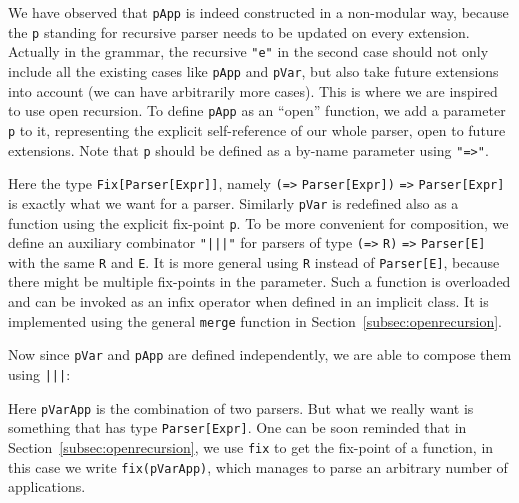 We have observed that \lstinline{pApp} is indeed constructed in a
non-modular way, because the \lstinline{p} standing for recursive
parser needs to be updated on every extension. Actually in the
grammar, the recursive \lstinline{"e"} in the second case should not
only include all the existing cases like \lstinline{pApp} and
\lstinline{pVar}, but also take future extensions into account (we can
have arbitrarily more cases). This is where we are inspired to use
open recursion. To define \lstinline{pApp} as an ``open'' function, we
add a parameter \lstinline{p} to it, representing the explicit
self-reference of our whole parser, open to future extensions. Note
that \lstinline{p} should be defined as a by-name parameter using
\lstinline{"=>"}.


Here the type \lstinline{Fix[Parser[Expr]]}, namely \lstinline{(=>} \lstinline{Parser[Expr])} \lstinline{=>} \lstinline{Parser[Expr]} is exactly what we want for a parser. Similarly \lstinline{pVar} is redefined also as a function using the explicit fix-point \lstinline{p}. To be more convenient for composition, we define an auxiliary combinator \lstinline{"|||"} for parsers of type \lstinline{(=>} \lstinline{R)} \lstinline{=>} \lstinline{Parser[E]} with the same \lstinline{R} and \lstinline{E}. It is more general using \lstinline{R} instead of \lstinline{Parser[E]}, because there might be multiple fix-points in the parameter. Such a function is overloaded and can be invoked as an infix operator when defined in an implicit class. It is implemented using the general \lstinline{merge} function in Section~\ref{subsec:openrecursion}.


Now since \lstinline{pVar} and \lstinline{pApp} are defined independently, we are able to compose them using \lstinline{|||}:


Here \lstinline{pVarApp} is the combination of two parsers. But what we really want is something that has type \lstinline{Parser[Expr]}. One can be soon reminded that in Section~\ref{subsec:openrecursion}, we use \lstinline{fix} to get the fix-point of a function, in this case we write \lstinline{fix(pVarApp)}, which manages to parse an arbitrary number of applications.

